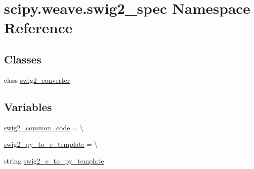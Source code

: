 \hypertarget{namespacescipy_1_1weave_1_1swig2__spec}{}\section{scipy.\+weave.\+swig2\+\_\+spec Namespace Reference}
\label{namespacescipy_1_1weave_1_1swig2__spec}
\subsection*{Classes}
\begin{DoxyCompactItemize}
\item 
class \hyperlink{classscipy_1_1weave_1_1swig2__spec_1_1swig2__converter}{swig2\+\_\+converter}
\end{DoxyCompactItemize}
\subsection*{Variables}
\begin{DoxyCompactItemize}
\item 
\hyperlink{namespacescipy_1_1weave_1_1swig2__spec_a8ced6c0ec9978c2a6606ea5c44731cc8}{swig2\+\_\+common\+\_\+code} = \textbackslash{}
\item 
\hyperlink{namespacescipy_1_1weave_1_1swig2__spec_afc8a59f295fd5260d8cbdf1cd9030b5c}{swig2\+\_\+py\+\_\+to\+\_\+c\+\_\+template} = \textbackslash{}
\item 
string \hyperlink{namespacescipy_1_1weave_1_1swig2__spec_ae4058ddac77e8e030972783bc0359818}{swig2\+\_\+c\+\_\+to\+\_\+py\+\_\+template}
\end{DoxyCompactItemize}


